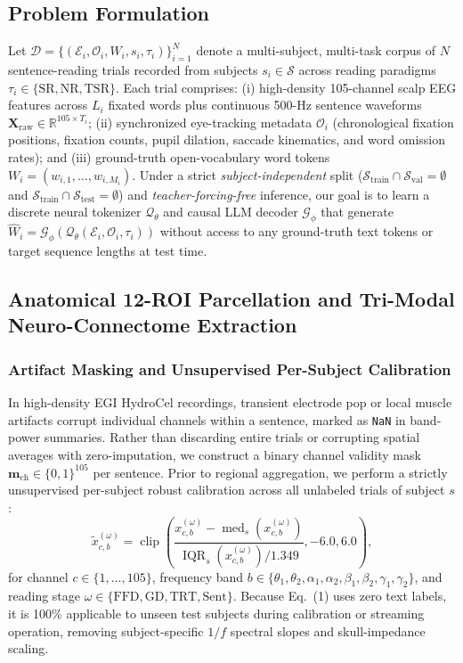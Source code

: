 \documentclass[journal]{IEEEtran}
\begin{document}
\subsection{Problem Formulation}
Let $\mathcal{D} = \{(\mathcal{E}_i, \mathcal{O}_i, W_i, s_i, \tau_i)\}_{i=1}^{N}$ denote a multi-subject, multi-task corpus of $N$ sentence-reading trials recorded from subjects $s_i \in \mathcal{S}$ across reading paradigms $\tau_i \in \{\text{SR}, \text{NR}, \text{TSR}\}$. Each trial comprises: (i) high-density 105-channel scalp EEG features across $L_i$ fixated words plus continuous 500-Hz sentence waveforms $\mathbf{X}_{\text{raw}} \in \mathbb{R}^{105 \times T_i}$; (ii) synchronized eye-tracking metadata $\mathcal{O}_i$ (chronological fixation positions, fixation counts, pupil dilation, saccade kinematics, and word omission rates); and (iii) ground-truth open-vocabulary word tokens $W_i = (w_{i,1}, \dots, w_{i,M_i})$. Under a strict \textit{subject-independent} split ($\mathcal{S}_{\text{train}} \cap \mathcal{S}_{\text{val}} = \emptyset$ and $\mathcal{S}_{\text{train}} \cap \mathcal{S}_{\text{test}} = \emptyset$) and \textit{teacher-forcing-free} inference, our goal is to learn a discrete neural tokenizer $\mathcal{Q}_\theta$ and causal LLM decoder $\mathcal{G}_\phi$ that generate $\hat{W}_i = \mathcal{G}_\phi(\mathcal{Q}_\theta(\mathcal{E}_i, \mathcal{O}_i, \tau_i))$ without access to any ground-truth text tokens or target sequence lengths at test time.

\subsection{Anatomical 12-ROI Parcellation and Tri-Modal Neuro-Connectome Extraction}

\subsubsection{Artifact Masking and Unsupervised Per-Subject Calibration}
In high-density EGI HydroCel recordings, transient electrode pop or local muscle artifacts corrupt individual channels within a sentence, marked as \texttt{NaN} in band-power summaries. Rather than discarding entire trials or corrupting spatial averages with zero-imputation, we construct a binary channel validity mask $\mathbf{m}_{\text{ch}} \in \{0,1\}^{105}$ per sentence. Prior to regional aggregation, we perform a strictly unsupervised per-subject robust calibration across all unlabeled trials of subject $s$:
\begin{equation}
    \tilde{x}_{c,b}^{(\omega)} = \operatorname{clip}\!\left(\frac{x_{c,b}^{(\omega)} - \operatorname{med}_{s}(x_{c,b}^{(\omega)})}{\operatorname{IQR}_{s}(x_{c,b}^{(\omega)}) / 1.349}, -6.0, 6.0\right),
\end{equation}
for channel $c \in \{1,\dots,105\}$, frequency band $b \in \{\theta_1, \theta_2, \alpha_1, \alpha_2, \beta_1, \beta_2, \gamma_1, \gamma_2\}$, and reading stage $\omega \in \{\text{FFD}, \text{GD}, \text{TRT}, \text{Sent}\}$. Because Eq.~(1) uses zero text labels, it is 100\% applicable to unseen test subjects during calibration or streaming operation, removing subject-specific $1/f$ spectral slopes and skull-impedance scaling.
\end{document}
